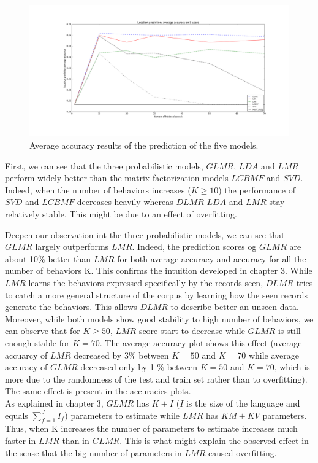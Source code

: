 \begin{figure} [!ht]
\centering
\includegraphics[scale=0.3]{Figures/location_average_accuracy.png}
\caption{Average accuracy results of the prediction of the five models.}
\label{avacc}
\end{figure}

First, we can see that the three probabilistic models, $GLMR$, $LDA$ and $LMR$ perform widely better than the matrix factorization models $LCBMF$ and $SVD$.
\\Indeed, when the number of behaviors increases ($K\geqslant 10$) the performance of $SVD$ and $LCBMF$ decreases heavily whereas $DLMR$ $LDA$ and $LMR$ stay relatively stable. This might be due to an effect of overfitting. \par

Deepen our observation int the three probabilistic models, we can see that $GLMR$ largely outperforms $LMR$. Indeed, the prediction scores og $GLMR$ are about 10\% better than $LMR$ for both average accuracy and accuracy for all the number of behaviors K. This confirms the intuition developed in chapter 3. While $LMR$ learns the behaviors expressed specifically by the records seen, $DLMR$ tries to catch a more general structure of the corpus by learning how the seen records generate the behaviors. This allows $DLMR$ to describe better an unseen data. Moreover, while both models show good stability to high number of behaviors, we can observe that for $K\geqslant 50$, $LMR$ score start to decrease while $GLMR$ is still enough stable for  $K=70$. The average accuracy plot shows this effect (average accuarcy of $LMR$ decreased by 3\% between $K = 50$ and $K = 70$ while average accuracy of $GLMR$ decreased only by 1 \% between $K = 50$ and $K = 70$, which is more due to the randomness of the test and train set rather than to overfitting). The same effect is present in the accuracies plots. 
\\As explained in chapter 3, $GLMR$ has $K+I$ ($I$ is the size of the language and equals $\sum_{f=1}^{J} I_f$) parameters to estimate while $LMR$ has $KM + KV$ parameters. Thus, when K increases the number of parameters to estimate increases much faster in $LMR$ than in $GLMR$. This is what might explain the observed effect in the sense that the big number of parameters in $LMR$ caused overfitting. \par

